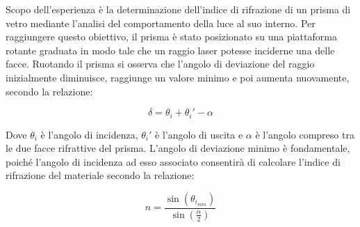 Scopo dell'esperienza è la determinazione dell'indice di rifrazione di un prisma di vetro mediante l'analisi del comportamento della luce al suo interno. Per raggiungere questo obiettivo, il prisma è stato posizionato su una piattaforma rotante graduata in modo tale che un raggio laser potesse inciderne una delle facce. Ruotando il prisma si osserva che l'angolo di deviazione del raggio inizialmente diminuisce, raggiunge un valore minimo e poi aumenta nuovamente, secondo la relazione:

\begin{equation}
	\delta=\theta_i+\theta_i'-\alpha
\end{equation}

Dove $\theta_i$ è l'angolo di incidenza, $\theta_i'$ è l'angolo di uscita e $\alpha$ è l'angolo compreso tra le due facce rifrattive del prisma. L'angolo di deviazione minimo è fondamentale, poiché l'angolo di incidenza ad esso associato consentirà di calcolare l'indice di rifrazione del materiale secondo la relazione:

\begin{equation}
	n=\frac{\sin(\theta_{i_{min}})}{\sin(\frac{\alpha}{2})}
\end{equation}